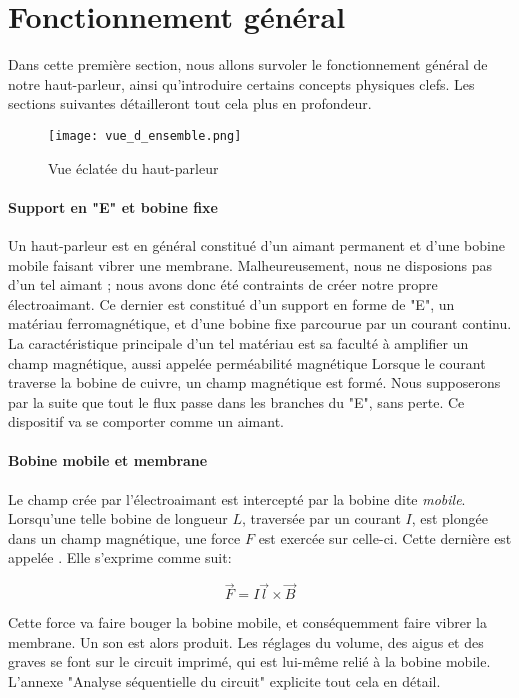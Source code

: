 

\section{Fonctionnement général}

Dans cette première section, nous allons survoler le fonctionnement général de notre haut-parleur, ainsi 
qu'introduire certains concepts physiques clefs. Les sections suivantes détailleront tout cela plus en 
profondeur.

\begin{figure}[ht!] 
\centering 
\texttt{[image: vue\_d\_ensemble.png]} 
\caption{Vue éclatée du haut-parleur} 
\label{hp-scheme} 
\end{figure}

\paragraph{}

\paragraph{Support en "E" et bobine fixe}
Un haut-parleur est en général constitué d'un aimant permanent et d'une bobine mobile faisant vibrer une 
membrane. Malheureusement, nous ne disposions pas d'un tel aimant ; nous avons donc été contraints de créer
notre propre électroaimant. Ce dernier est constitué d'un support en forme de "E", un matériau ferromagnétique, et 
d'une bobine fixe parcourue par un courant continu. La caractéristique principale d'un tel matériau est sa 
faculté à amplifier un champ magnétique, aussi appelée perméabilité magnétique \cite{wiki-perm-magn}
Lorsque le courant traverse la bobine de cuivre, un champ magnétique est formé. Nous supposerons par la 
suite que tout le flux passe dans les branches du "E", sans perte. Ce dispositif va se comporter comme un
aimant.

\paragraph{Bobine mobile et membrane}
Le champ crée par l'électroaimant est intercepté par la bobine dite \textit{mobile}. Lorsqu'une telle bobine
de longueur $L$, traversée par un courant $I$, est plongée dans un champ magnétique, une force $F$ est exercée
sur celle-ci. Cette dernière est appelée . Elle s'exprime comme suit:

$$\vec{F} = I\vec{l}\times{\vec{B}}$$ 

Cette force va faire bouger la bobine mobile, et conséquemment faire vibrer la membrane. Un son est alors 
produit. Les réglages du volume, des aigus et des graves se font sur le circuit imprimé, qui est lui-même relié à la
bobine mobile. L'annexe "Analyse séquentielle du circuit" explicite tout cela en détail.

